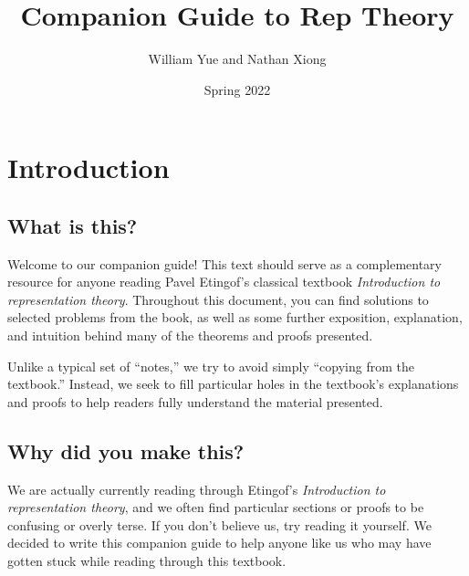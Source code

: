 \documentclass[oneside]{scrbook}
\title{Companion Guide to Rep Theory}
\author{William Yue and Nathan Xiong}
\date{Spring 2022}
\begin{document}
\maketitle

\chapter*{Introduction}
\section{What is this?}
Welcome to our companion guide! This text should serve as a complementary resource for anyone reading Pavel Etingof's classical textbook \textit{Introduction to representation theory}. Throughout this document, you can find solutions to selected problems from the book, as well as some further exposition, explanation, and intuition behind many of the theorems and proofs presented.

Unlike a typical set of ``notes,'' we try to avoid simply ``copying from the textbook.'' Instead, we seek to fill particular holes in the textbook's explanations and proofs to help readers fully understand the material presented.

\section{Why did you make this?}
We are actually currently reading through Etingof's \textit{Introduction to representation theory}, and we often find particular sections or proofs to be confusing or overly terse. If you don't believe us, try reading it yourself. We decided to write this companion guide to help anyone like us who may have gotten stuck while reading through this textbook.
\end{document}
